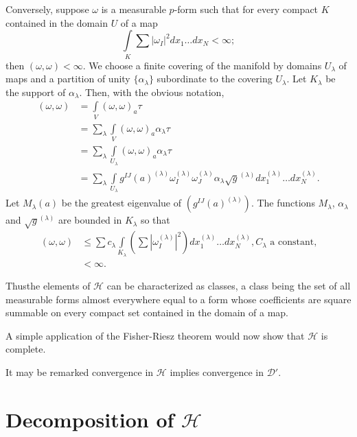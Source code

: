 Conversely, suppose $\omega$ is a measurable $p$-form such that for
every compact $K$ contained in the domain $U$ of a map
$$
\int\limits_{K}\sum|\omega_{I}|^{2}dx_{1}\ldots dx_{N}<\infty;
$$
then $(\omega,\omega)<\infty$. We choose a finite covering of the
manifold by domains $U_{\lambda}$ of maps and a partition of unity
$\{\alpha_{\lambda}\}$ subordinate to the covering $U_{\lambda}$. Let
$K_{\lambda}$ be the support of $\alpha_{\lambda}$. Then, with the
obvious notation,
\begin{align*}
(\omega,\omega) &= \int\limits_{V}(\omega,\omega)_{a}\tau\\
&=
  \sum_{\lambda}\int\limits_{V}(\omega,\omega)_{a}\alpha_{\lambda}\tau\\
&=
  \sum_{\lambda}\int\limits_{U_{\lambda}}(\omega,\omega)_{a}\alpha_{\lambda}\tau\\
&=
  \sum_{\lambda}\int\limits_{U_{\lambda}}g^{IJ}(a)^{(\lambda)}\omega^{(\lambda)}_{I}\omega^{(\lambda)}_{J}\alpha_{\lambda}\sqrt{g}^{(\lambda)}dx^{(\lambda)}_{1}\ldots
  dx_{N}^{(\lambda)}.
\end{align*}
Let $M_{\lambda}(a)$ be the greatest eigenvalue of
$(g^{IJ}(a)^{(\lambda)})$. The functions $M_{\lambda}$,
$\alpha_{\lambda}$ and $\sqrt{g}^{(\lambda)}$ are bounded in
$K_{\lambda}$ so that
\begin{align*}
(\omega,\omega) &\leq \sum
  c_{\lambda}\int\limits_{K_{\lambda}}
  \left(\sum|\omega_{I}^{(\lambda)}|^{2}\right) dx^{(\lambda)}_{1}\ldots
  dx^{(\lambda)}_{N},C_{\lambda}\text{ \ a constant,}\\
&<\infty. 
\end{align*}

Thus\pageoriginale the elements of $\mathscr{H}$ can be characterized
as classes, a class being the set of all measurable forms almost
everywhere equal to a form whose coefficients are square summable on
every compact set contained in the domain of a map.

A simple application of the Fisher-Riesz theorem would now show that
$\mathscr{H}$ is complete.

It may be remarked convergence in $\mathscr{H}$ implies convergence in
$\mathscr{D}'$. 

\section*{Decomposition of $\mathscr{H}$}

